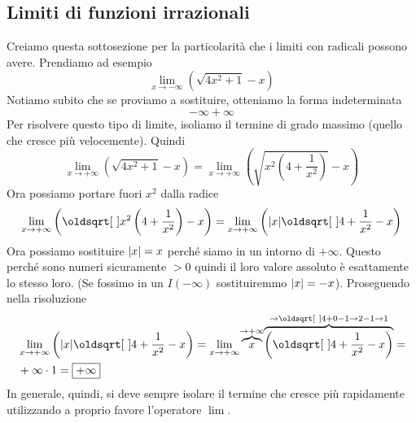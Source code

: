 \subsection{Limiti di funzioni irrazionali}
Creiamo questa sottosezione per la particolarità che i limiti con radicali possono avere. Prendiamo ad
esempio
\begin{equation*}
\lim\limits_{x\to-\infty}\left(\sqrt{4x^2+1}-x\right)
\end{equation*}
Notiamo subito che se proviamo a sostituire, otteniamo la forma indeterminata
\begin{equation*}
-\infty+\infty
\end{equation*}
Per risolvere questo tipo di limite, isoliamo il termine di grado massimo (quello che cresce più 
velocemente). Quindi
\begin{equation*}
\lim\limits_{x\to+\infty}\left(\sqrt{4x^2+1}-x\right) = 
\lim\limits_{x\to+\infty}\left(\sqrt{x^2\left(4+\frac{1}{x^2}\right)}-x\right)
\end{equation*}
Ora possiamo portare fuori $x^2$ dalla radice
\begin{equation*}
\lim\limits_{x\to+\infty}\left(\sqrt{x^2\left(4+\frac{1}{x^2}\right)}-x\right) =
\lim\limits_{x\to+\infty}\left(\abs{x}\sqrt{4+\frac{1}{x^2}}-x\right)
\end{equation*}
Ora possiamo sostituire $\lvert x\rvert = x$ perché siamo in un intorno di $+\infty$. Questo perché sono 
numeri sicuramente $>0$ quindi il loro valore assoluto è esattamente lo stesso loro. (Se fossimo in un
$I(-\infty)$ sostituiremmo $\lvert x\rvert = -x$). Proseguendo nella risoluzione
\begin{align*}
&\lim\limits_{x\to+\infty}\left(\abs{x}\sqrt{4+\frac{1}{x^2}}-x\right)=
\lim\limits_{x\to+\infty}\overbrace{x}^{\mathclap{\to+\infty}}
\overbrace{\left(\sqrt{4+\frac{1}{x^2}}-x\right)}^{\mathclap{\to\sqrt{4+0}-1\to2-1\to1}}=\\
&+\infty\cdot1 = \boxed{+\infty}
\end{align*}
In generale, quindi, si deve sempre isolare il termine che cresce più rapidamente utilizzando a proprio
favore l'operatore $\lim$.

